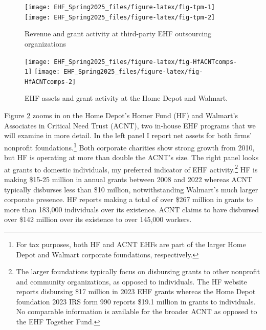 \documentclass[
  11pt,
  oneside]{article}
\begin{document}
\begin{figure}
\texttt{[image: EHF\_Spring2025\_files/figure-latex/fig-tpm-1]} \texttt{[image: EHF\_Spring2025\_files/figure-latex/fig-tpm-2]} \caption{Revenue and grant activity at third-party EHF outsourcing organizations}\label{fig:fig-tpm}
\end{figure}

\begin{figure}
\texttt{[image: EHF\_Spring2025\_files/figure-latex/fig-HfACNTcomps-1]} \texttt{[image: EHF\_Spring2025\_files/figure-latex/fig-HfACNTcomps-2]} \caption{EHF assets and grant activity at the Home Depot and Walmart.}\label{fig:fig-HfACNTcomps}
\end{figure}

Figure \ref{fig:fig-HfACNTcomps} zooms in on the Home Depot's Homer Fund (HF) and Walmart's Associates in Critical Need Trust (ACNT), two in-house EHF programs that we will examine in more detail. In the left panel I report net assets for both firms' nonprofit foundations.\footnote{For tax purposes, both HF and ACNT EHFs are part of the larger Home Depot and Walmart corporate foundations, respectively.} Both corporate charities show strong growth from 2010, but HF is operating at more than double the ACNT's size. The right panel looks at grants to domestic individuals, my preferred indicator of EHF activity.\footnote{The larger foundations typically focus on disbursing grants to other nonprofit and community organizations, as opposed to individuals. The HF website reports disbursing \$17 million in 2023 EHF grants whereas the Home Depot foundation 2023 IRS form 990 reports \$19.1 million in grants to individuals. No comparable information is available for the broader ACNT as opposed to the EHF Together Fund.} HF is making \$15-25 million in annual grants between 2008 and 2022 whereas ACNT typically disburses less than \$10 million, notwithstanding Walmart's much larger corporate presence. HF reports making a total of over \$267 million in grants to more than 183,000 individuals over its existence. ACNT claims to have disbursed over \$142 million over its existence to over 145,000 workers.
\end{document}
